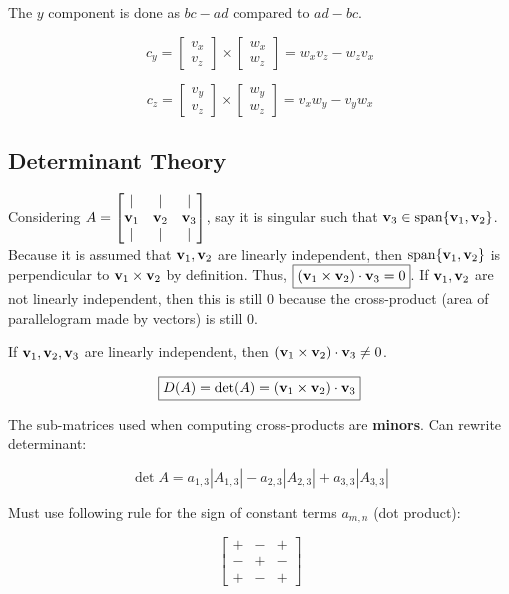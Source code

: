 The $y$ component is done as $bc-ad$ compared to $ad-bc$.

\[c_y=\begin{bmatrix}v_x\\ v_z\end{bmatrix}\times \begin{bmatrix}w_x\\ w_z\end{bmatrix}=w_xv_z-w_zv_x\]

\[c_z=\begin{bmatrix}v_y\\ v_z\end{bmatrix}\times \begin{bmatrix}w_y\\ w_z\end{bmatrix}=v_xw_y-v_yw_x\]

\subsection{Determinant Theory}

Considering $A=\begin{bmatrix}|&|&| \\\textbf v_1 & \textbf v_2 &\textbf v_3 \\ |&|&| \\ \end{bmatrix}$,
say it is singular such that $\textbf{v}_3\in \mathrm{span}\{\textbf{v}_1,\textbf{v}_2\}$. Because it is assumed that
$\textbf{v}_1,\textbf{v}_2$ are linearly independent, then $\mathrm{span}\{\textbf{v}_1,\textbf{v}_2\}$ is perpendicular to 
$\textbf{v}_1\times \textbf{v}_2$ by definition. Thus, $\boxed{(\textbf{v}_1\times\textbf{v}_2)\cdot \textbf{v}_3=0}$.
If $\textbf{v}_1,\textbf{v}_2$ are not linearly independent, then this is still 0 because the cross-product (area of parallelogram made by vectors)
is still 0.

\noindent
If $\textbf{v}_1,\textbf{v}_2,\textbf{v}_3$ are linearly independent, then $(\textbf{v}_1\times\textbf{v}_2)\cdot \textbf{v}_3\neq0$.

\[\boxed{D(A)=\mathrm{det}(A)=(\textbf{v}_1\times\textbf{v}_2)\cdot \textbf{v}_3}\]

\noindent
The sub-matrices used when computing cross-products are \textbf{minors}.
Can rewrite determinant:

\[\boxed{\det A= a_{1,3}\left|A_{1,3}\right|-a_{2,3}\left|A_{2,3}\right|+a_{3,3}\left|A_{3,3}\right|}\]

Must use following rule for the sign of constant terms $a_{m,n}$ (dot product):

\[\begin{bmatrix}+&-&+\\-&+&-\\+&-&+\end{bmatrix}\]

